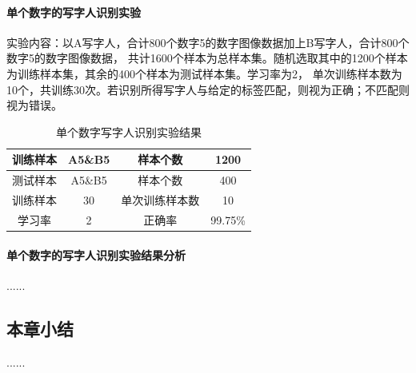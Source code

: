 \paragraph{单个数字的写字人识别实验}
\hspace*{\parindent}实验内容：以A写字人，合计800个数字5的数字图像数据加上B写字人，合计800个数字5的数字图像数据，
共计1600个样本为总样本集。随机选取其中的1200个样本为训练样本集，其余的400个样本为测试样本集。学习率为2，
单次训练样本数为10个，共训练30次。若识别所得写字人与给定的标签匹配，则视为正确；不匹配则视为错误。
\begin{table}[!htbp]
    \centering
    \caption{单个数字写字人识别实验结果}
    \begin{tabular}[\textwidth]{c|c|c|c}
        \hline
        训练样本 & A5\&B5 & 样本个数 & 1200 \\
        \hline
        测试样本 & A5\&B5 & 样本个数 & 400 \\
        \hline
        训练样本 & 30 & 单次训练样本数 & 10 \\
        \hline
        学习率 & 2 & 正确率 & 99.75\% \\
        \hline
    \end{tabular}
\end{table}

\paragraph{单个数字的写字人识别实验结果分析}
\hspace*{\parindent}......

\subsection{本章小结}
......

\newpage
